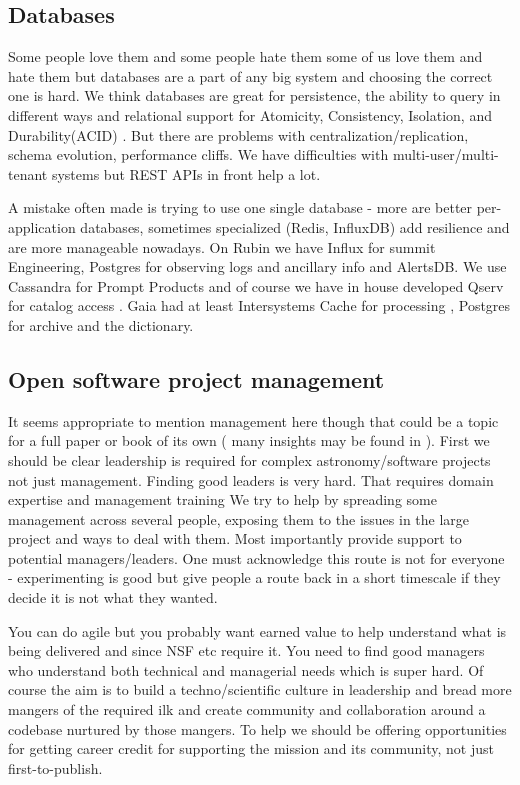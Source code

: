 \documentclass[11pt,twoside]{article}
\begin{document}
\subsection{Databases}
Some people love them and some people hate them some of us love them and hate them but databases are a part of any big system and choosing the correct one is hard.
We think databases are great for persistence, the ability to query in different ways and relational support for Atomicity, Consistency, Isolation, and Durability(ACID) .
But there are problems with centralization/replication, schema evolution, performance cliffs.
We have  difficulties with multi-user/multi-tenant systems but
REST APIs in front help a lot.

A mistake often made is trying to use one single database -
more are better per-application databases, sometimes specialized (Redis, InfluxDB) add resilience and are more manageable nowadays.
On Rubin we have Influx for summit Engineering, Postgres for observing logs and ancillary info and AlertsDB.
We use Cassandra for Prompt Products and of course we have in house developed Qserv for catalog access \citep{C15_adassxxxii}.
Gaia had at least Intersystems Cache for processing \cite{2011ExA....31..215O}, Postgres for archive and the dictionary.

\subsection{Open software project management}
It seems appropriate to mention management here though that could be a topic for a full paper or book of its own
( many insights may be found in \citet{OMULLANE2005}).
First we should be clear leadership is required for complex astronomy/software projects not just management.
Finding good leaders is very hard.
That requires domain expertise and management training
We try to help by spreading some management across several people, exposing them to the issues in the large project and ways to deal with them.
Most importantly provide support to potential managers/leaders.
One must  acknowledge this route is not for everyone  - experimenting is good but give people a route back in a short timescale if they decide it is not what  they wanted.

You can do agile but you probably want earned value \citep{2014SPIE.9150E..1EG,2016SPIE.9911E..0NK} to help understand what is being delivered and since NSF etc require it.
You need to find good managers who understand both technical and managerial needs which is  super hard.
Of course the aim is to build a techno/scientific  culture in leadership and bread more mangers of the required ilk and
create community and collaboration around a codebase nurtured by those mangers.
To help
we should be offering opportunities for getting career credit for supporting the mission and its community, not just first-to-publish.
\end{document}
